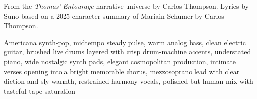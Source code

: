 
\begin{notes}
From the \emph{Thomas' Entourage} narrative universe by Carlos Thompson. Lyrics by Suno based on a 2025 character summary of Mariain Schumer by Carlos Thompson.
\end{notes}
\begin{style}
Americana synth-pop, midtempo steady pulse, warm analog bass, clean electric guitar, brushed live drums layered with crisp drum-machine accents, understated piano, wide nostalgic synth pads, elegant cosmopolitan production, intimate verses opening into a bright memorable chorus, mezzosoprano lead with clear diction and sly warmth, restrained harmony vocals, polished but human mix with tasteful tape saturation
\end{style}
